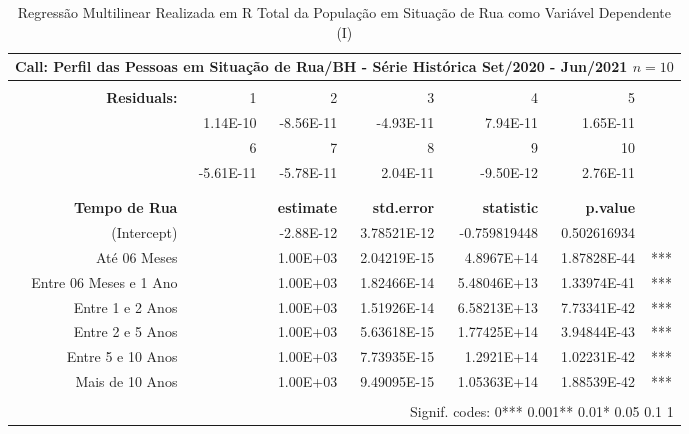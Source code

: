 \documentclass[12pt]{article}
\begin{document}
\begin{landscape}
\pagestyle{empty}

\begin{table}[htbp]
  \centering
  \caption{Regressão Multilinear Realizada em R Total da População em Situação de Rua como Variável Dependente (I)}
    \begin{tabular}{rrrrrrr}
    \hline
    \multicolumn{7}{c}{Call: Perfil das Pessoas em Situação de Rua/BH - Série Histórica Set/2020 - Jun/2021 $n = 10$} \\
    \midrule
         &      &      &      &      &      &  \\
    \textbf{Residuals:} & 1    & 2    & 3    & 4    & 5    &  \\
         & 1.14E-10 & -8.56E-11 & -4.93E-11 & 7.94E-11 & 1.65E-11 &  \\
         & 6    & 7    & 8    & 9    & 10   &  \\
         & -5.61E-11 & -5.78E-11 & 2.04E-11 & -9.50E-12 & 2.76E-11 &  \\
         &      &      &      &      &      &  \\
         &      &      &      &      &      &  \\
    \textbf{Tempo de Rua} &      & \textbf{estimate} & \textbf{std.error} & \textbf{statistic} & \textbf{p.value} &  \\
    (Intercept) &      & -2.88E-12 & 3.78521E-12 & -0.759819448 & 0.502616934 &  \\
    Até 06 Meses &      & 1.00E+03 & 2.04219E-15 & 4.8967E+14 & 1.87828E-44 & \multicolumn{1}{c}{***} \\
    Entre 06 Meses e 1 Ano &      & 1.00E+03 & 1.82466E-14 & 5.48046E+13 & 1.33974E-41 & \multicolumn{1}{c}{***} \\
    Entre 1 e 2 Anos &      & 1.00E+03 & 1.51926E-14 & 6.58213E+13 & 7.73341E-42 & \multicolumn{1}{c}{***} \\
    Entre 2 e 5 Anos &      & 1.00E+03 & 5.63618E-15 & 1.77425E+14 & 3.94844E-43 & \multicolumn{1}{c}{***} \\
    Entre 5 e 10 Anos &      & 1.00E+03 & 7.73935E-15 & 1.2921E+14 & 1.02231E-42 & \multicolumn{1}{c}{***} \\
    Mais de 10 Anos &      & 1.00E+03 & 9.49095E-15 & 1.05363E+14 & 1.88539E-42 & \multicolumn{1}{c}{***} \\
         &      &      &      &      &      &  \\
    \midrule
    \multicolumn{7}{r}{Signif. codes:  0***  0.001**  0.01*  0.05  0.1  1} \\

\end{tabular}
\end{table}
\end{landscape}
\end{document}
